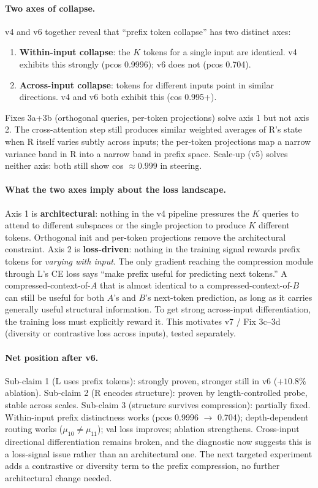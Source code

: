 \documentclass[11pt, a4paper]{article}
\theoremstyle{plain}
\theoremstyle{definition}
\theoremstyle{remark}
\begin{document}
\paragraph{Two axes of collapse.}
v4 and v6 together reveal that ``prefix token collapse'' has two distinct axes:
\begin{enumerate}[nosep]
\item \textbf{Within-input collapse}: the $K$ tokens for a single input are identical. v4 exhibits this strongly (pcos 0.9996); v6 does not (pcos 0.704).
\item \textbf{Across-input collapse}: tokens for different inputs point in similar directions. v4 and v6 both exhibit this (cos 0.995+).
\end{enumerate}
Fixes 3a+3b (orthogonal queries, per-token projections) solve axis 1 but not axis 2.
The cross-attention step still produces similar weighted averages of R's state when R itself varies subtly across inputs; the per-token projections map a narrow variance band in R into a narrow band in prefix space.
Scale-up (v5) solves neither axis: both still show cos $\approx 0.999$ in steering.

\paragraph{What the two axes imply about the loss landscape.}
Axis 1 is \textbf{architectural}: nothing in the v4 pipeline pressures the $K$ queries to attend to different subspaces or the single projection to produce $K$ different tokens. Orthogonal init and per-token projections remove the architectural constraint.
Axis 2 is \textbf{loss-driven}: nothing in the training signal rewards prefix tokens for \emph{varying with input}.
The only gradient reaching the compression module through L's CE loss says ``make prefix useful for predicting next tokens.''
A compressed-context-of-$A$ that is almost identical to a compressed-context-of-$B$ can still be useful for both $A$'s and $B$'s next-token prediction, as long as it carries generally useful structural information.
To get strong across-input differentiation, the training loss must explicitly reward it.
This motivates v7 / Fix 3c--3d (diversity or contrastive loss across inputs), tested separately.

\paragraph{Net position after v6.}
Sub-claim 1 (L uses prefix tokens): strongly proven, stronger still in v6 ($+10.8\%$ ablation).
Sub-claim 2 (R encodes structure): proven by length-controlled probe, stable across scales.
Sub-claim 3 (structure survives compression): partially fixed.
Within-input prefix distinctness works (pcos 0.9996 $\to$ 0.704); depth-dependent routing works ($\mu_{10} \neq \mu_{11}$); val loss improves; ablation strengthens.
Cross-input directional differentiation remains broken, and the diagnostic now suggests this is a loss-signal issue rather than an architectural one.
The next targeted experiment adds a contrastive or diversity term to the prefix compression, no further architectural change needed.
\end{document}
